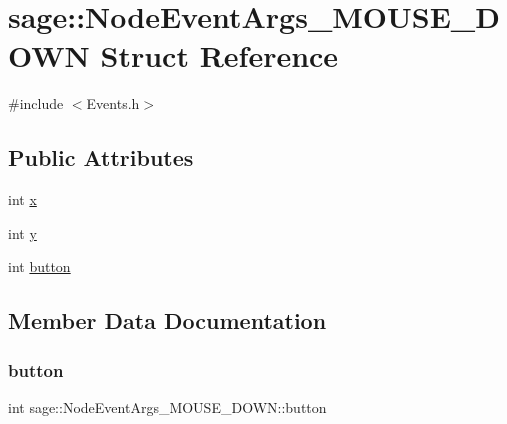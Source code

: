 \hypertarget{structsage_1_1NodeEventArgs__MOUSE__DOWN}{}\section{sage\+::Node\+Event\+Args\+\_\+\+M\+O\+U\+S\+E\+\_\+\+D\+O\+WN Struct Reference}
\label{structsage_1_1NodeEventArgs__MOUSE__DOWN}


{\ttfamily \#include $<$Events.\+h$>$}

\subsection*{Public Attributes}
\begin{DoxyCompactItemize}
\item 
int \mbox{\hyperlink{structsage_1_1NodeEventArgs__MOUSE__DOWN_a0c5c049b92c01eef6e4cd20de898dd6f}{x}}
\item 
int \mbox{\hyperlink{structsage_1_1NodeEventArgs__MOUSE__DOWN_a7ebb1ccfb770abb65962563ad9f6becd}{y}}
\item 
int \mbox{\hyperlink{structsage_1_1NodeEventArgs__MOUSE__DOWN_a1cc60f4e5ca077e868a7cb944f4ab01c}{button}}
\end{DoxyCompactItemize}


\subsection{Member Data Documentation}
\mbox{\label{structsage_1_1NodeEventArgs__MOUSE__DOWN_a1cc60f4e5ca077e868a7cb944f4ab01c}} 
\subsubsection{\texorpdfstring{button}{button}}
{\footnotesize\ttfamily int sage\+::\+Node\+Event\+Args\+\_\+\+M\+O\+U\+S\+E\+\_\+\+D\+O\+W\+N\+::button}

\mbox{\label{structsage_1_1NodeEventArgs__MOUSE__DOWN_a0c5c049b92c01eef6e4cd20de898dd6f}} 

